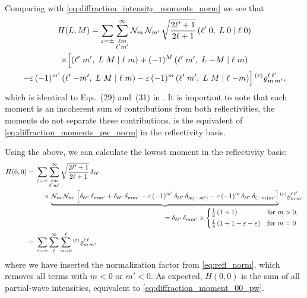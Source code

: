 Comparing with \cref{eq:diffraction_intensity_moments_norm} we see
that
\begin{multline}
  \label{eq:diffraction_moments_pw_refl_norm}
  H(L, M)
  = \sum_{\varepsilon = \pm} \sum_{\substack{\ell m \\ \ell' m'}}^\infty
  \mathcal{N}_m\, \mathcal{N}_{m'}\,
  \sqrt{\frac{2 \ell' + 1}{2 \ell + 1}}\,
  ({\ell'}\;{0},\;{L}\;{0}\; |\; {\ell}\;{0}) \\
  \times \Big[
    ({\ell'}\;{m'},\;{L}\;{M}\; |\; {\ell}\;{m})
    + (-1)^M\, ({\ell'}\;{m'},\;{L}\;{-M}\; |\; {\ell}\;{m}) \\
    - \varepsilon\, (-1)^{m'}\, ({\ell'}\;{-m'},\;{L}\;{M}\; |\; {\ell}\;{m})
    - \varepsilon\, (-1)^m\, ({\ell'}\;{m'},\;{L}\;{M}\; |\; {\ell}\;{-m}) \Big]
  \prescript{(\ensuremath{\varepsilon})}{}{\varrho}^{\ell\, \ell'}_{m\, m'},
\end{multline}
which is identical to Eqs.~(29) and~(31) in .
It is important to note that each moment is an incoherent sum of
contributions from both reflectivities, \ie the moments do not
separate these contributions.
 is the equivalent of
\cref{eq:diffraction_moments_pw_norm} in the reflectivity basis.

Using the above, we can calculate the lowest moment in the
reflectivity basis:
\begin{align}
  H(0, 0)
  ={}& \begin{multlined}[t]
    \sum_{\refl = \pm} \sum_{\substack{\ell m \\ \ell' m'}}^\infty
    \sqrt{\frac{2 \ell' + 1}{2 \ell + 1}}\,
    \delta_{\ell \ell'}
    \\
    \times \rdUnderbrace{\mathcal{N}_m\, \mathcal{N}_{m'} \sBrk[2]{%
      \delta_{\ell \ell'}\, \delta_{m m'}
      + \delta_{\ell \ell'}\, \delta_{m m'}
      - \refl\, (-1)^{m'}\, \delta_{\ell \ell'}\, \delta_{m (-m')}
      - \refl\, (-1)^m\, \delta_{\ell \ell'}\, \delta_{(-m) m'}}}%
      {= \delta_{\ell \ell'}\, \delta_{m m'} \times
      \begin{cases*}
        \frac{1}{2}\, (1 + 1)                 & for $m > 0$, \\
        \frac{1}{4}\, (1 + 1 - \refl - \refl) & for $m = 0$
      \end{cases*}}
    \prescript{(\refl)}{}{\varrho}^{\ell\, \ell'}_{m\, m'}
  \end{multlined} \nonumber
  \\
  \label{eq:diffraction_moment_00_pw_refl}
  ={}& \sum_{\refl = \pm} \sum_\ell^\infty \sum_{m = 0}^\ell \prescript{(\refl)}{}{\varrho}^{\ell\, \ell}_{m\, m},
\end{align}
where we have inserted the normalization factor from
\cref{eq:refl_norm}, which removes all terms with $m < 0$ or $m' < 0$.
As expected, $H(0, 0)$ is the sum of all partial-wave intensities,
equivalent to \cref{eq:diffraction_moment_00_pw}.


